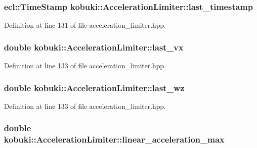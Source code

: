 \subsubsection[{last\-\_\-timestamp}]{\setlength{\rightskip}{0pt plus 5cm}ecl\-::\-Time\-Stamp {\bf kobuki\-::\-Acceleration\-Limiter\-::last\-\_\-timestamp}\hspace{0.3cm}{\ttfamily  [private]}}\label{classkobuki_1_1AccelerationLimiter_aa09a6b30cb4807218a8c611a763c1314}


\-Definition at line 131 of file acceleration\-\_\-limiter.\-hpp.

\subsubsection[{last\-\_\-vx}]{\setlength{\rightskip}{0pt plus 5cm}double {\bf kobuki\-::\-Acceleration\-Limiter\-::last\-\_\-vx}\hspace{0.3cm}{\ttfamily  [private]}}\label{classkobuki_1_1AccelerationLimiter_a1af05999946b0cdcbe2ab0935b1ccbf8}


\-Definition at line 133 of file acceleration\-\_\-limiter.\-hpp.

\subsubsection[{last\-\_\-wz}]{\setlength{\rightskip}{0pt plus 5cm}double {\bf kobuki\-::\-Acceleration\-Limiter\-::last\-\_\-wz}\hspace{0.3cm}{\ttfamily  [private]}}\label{classkobuki_1_1AccelerationLimiter_a2d1c0d363ba76e38bd56ecc572416682}


\-Definition at line 133 of file acceleration\-\_\-limiter.\-hpp.

\subsubsection[{linear\-\_\-acceleration\-\_\-max}]{\setlength{\rightskip}{0pt plus 5cm}double {\bf kobuki\-::\-Acceleration\-Limiter\-::linear\-\_\-acceleration\-\_\-max}\hspace{0.3cm}{\ttfamily  [private]}}\label{classkobuki_1_1AccelerationLimiter_ae3590371d3d9ffe38481162d41ad7537}


